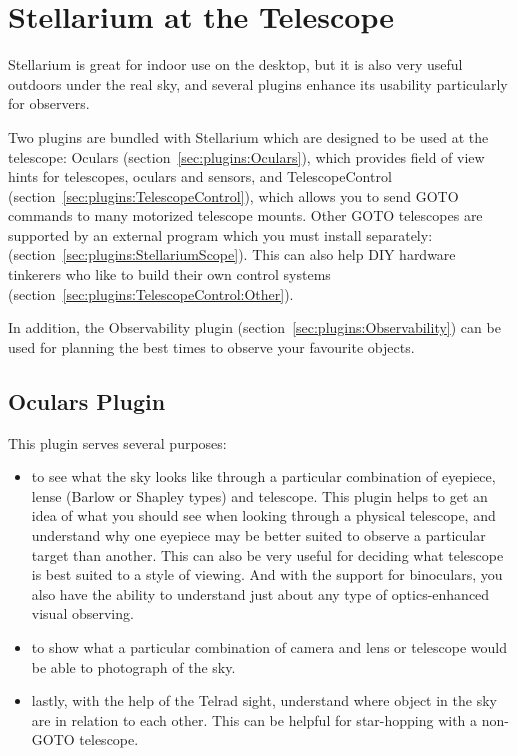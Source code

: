 \chapter{Stellarium at the Telescope}
\label{ch:atTheTelescope}

Stellarium is great for indoor use on the desktop, but it is also very
useful outdoors under the real sky, and several plugins enhance its
usability particularly for observers.

Two plugins are bundled with Stellarium which are designed to be used
at the telescope: Oculars (section~\ref{sec:plugins:Oculars}), which
provides field of view hints for telescopes, oculars and sensors, and
TelescopeControl (section~\ref{sec:plugins:TelescopeControl}), which
allows you to send GOTO commands to many motorized telescope mounts. Other
GOTO telescopes are supported by an external program which you must
install separately: 
(section~\ref{sec:plugins:StellariumScope}). This can also help DIY hardware 
tinkerers who like to build their own control systems (section~\ref{sec:plugins:TelescopeControl:Other}).

In addition, the Observability plugin (section~\ref{sec:plugins:Observability})
can be used for planning the best times to observe your favourite
objects.

\section{Oculars Plugin}
\label{sec:plugins:Oculars}

This plugin serves several purposes:
\begin{itemize}
\item to see what the sky looks like through a particular combination of eyepiece, lense (Barlow or Shapley types) and telescope. This plugin helps to get an idea of what you should see when looking through a physical telescope, and understand why one eyepiece may be better suited to observe a particular target than another. This can also be very useful for deciding what telescope is best suited to a style of viewing. And with the support for binoculars, you also have the ability to understand just about any type of optics-enhanced visual observing.
\item to show what a particular combination of camera and lens or telescope would be able to photograph of the sky. 
\item lastly, with the help of the Telrad sight, understand where object in the sky are in relation to each other. 
This can be helpful for star-hopping with a non-GOTO telescope. 
\end{itemize}

